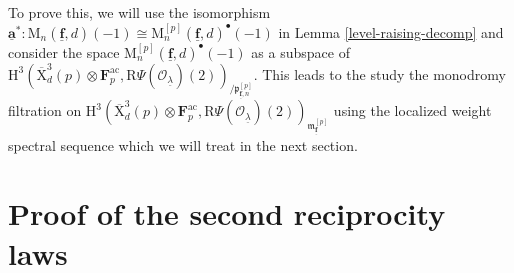 \documentclass[10pt]{amsart}
\numberwithin{equation}{section}
\theoremstyle{plain}
\numberwithin{equation}{section}
\theoremstyle{definition}
\theoremstyle{remark}
\def\ac{\mathrm{ac}}
\def\frakm{\mathfrak{m}}
\def\ac{\mathrm{ac}}
\def\undlamb{\underline{\lambda}}
\def\triplef{\underline{\mathbf{f}}}
\def\calO{\mathcal{O}}
\def\frakm{\mathfrak{m}}
\def\frakp{\mathfrak{p}}
\def\FF{\mathbf{F}}
\def\rmH{\mathrm{H}}
\def\rmM{\mathrm{M}}
\def\rmX{\mathrm{X}}
\def\rmR{\mathrm{R}}
\begin{document}
To prove this, we will use the isomorphism $\underline{\mathbf{a}}^{\ast}:\rmM_{n}(\triplef, d)(-1)\cong\rmM^{[p]}_{n}(\triplef, d)^{\bullet}(-1)$ in Lemma \ref{level-raising-decomp} and consider the space $\rmM^{[p]}_{n}(\triplef, d)^{\bullet}(-1)$ as a subspace of $\rmH^{3}(\overline{\rmX}^{3}_{d}(p)\otimes\FF^{\ac}_{p}, \rmR\Psi(\calO_{\undlamb})(2))_{/\frakp^{[p]}_{\triplef,n}}$.
This leads to the study the monodromy filtration on $\rmH^{3}(\overline{\rmX}^{3}_{d}(p)\otimes\FF^{\ac}_{p}, \rmR\Psi(\calO_{\undlamb})(2))_{\frakm^{[p]}_{\triplef}}$ using the localized weight spectral sequence which we will treat in the next section.

\section{Proof of the second reciprocity laws}
\end{document}
